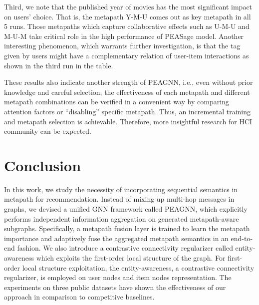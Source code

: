 \documentclass[runningheads, envcountsame, a4paper]{llncs}
\begin{document}
Third, we note that the published year of movies has the most significant impact on users’ choice. That is, the metapath Y-M-U comes out as key metapath in all 5 runs. 
Those metapaths which capture collaborative effects such as U-M-U and M-U-M take critical role in the high performance of PEASage model.
Another interesting phenomenon, which warrants further investigation, is that the tag given by users might have a complementary relation of user-item interactions as shown in the third run in the table.

These results also indicate another strength of PEAGNN, i.e., even without prior knowledge and careful selection, the effectiveness of each metapath and different metapath combinations can be verified in a convenient way by comparing attention factors or ``disabling'' specific metapath. Thus, an incremental training and metapath selection is achievable. Therefore, more insightful research for HCI community can be expected. 

 
\section{Conclusion}
In this work, we study the necessity of incorporating sequential semantics in metapath for recommendation. Instead of mixing up multi-hop messages in graphs, we devised a unified GNN framework called PEAGNN, which explicitly performs independent information aggregation on generated metapath-aware subgraphs. 
Specifically, a metapath fusion layer is trained to learn the metapath importance and adaptively fuse the aggregated metapath semantics in an end-to-end fashion. 
We also introduce a contrastive connectivity regularizer called entity-awareness which exploits the first-order local structure of the graph.
For first-order local structure exploitation, the entity-awareness, a contrastive connectivity regularizer, is employed on user nodes and item nodes representation.
The experiments on three public datasets have shown the effectiveness of our approach in comparison to competitive baselines.


 


\end{document}
